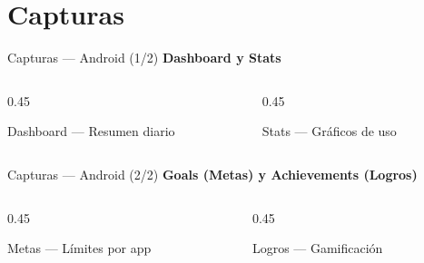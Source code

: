 \documentclass[aspectratio=169]{beamer}
\begin{document}
\section{Capturas}
\begin{frame}{Capturas --- Android (1/2)}
  \centering
  \textbf{Dashboard y Stats}
  \vspace{0.3cm}

  \begin{columns}[T]
    \begin{column}{0.45\textwidth}
      \centering
      \par
      \tiny{Dashboard --- Resumen diario}
    \end{column}
    \begin{column}{0.45\textwidth}
      \centering
      \par
      \tiny{Stats --- Gr\'aficos de uso}
    \end{column}
  \end{columns}
\end{frame}

\begin{frame}{Capturas --- Android (2/2)}
  \centering
  \textbf{Goals (Metas) y Achievements (Logros)}
  \vspace{0.3cm}

  \begin{columns}[T]
    \begin{column}{0.45\textwidth}
      \centering
      \par
      \tiny{Metas --- L\'imites por app}
    \end{column}
    \begin{column}{0.45\textwidth}
      \centering
      \par
      \tiny{Logros --- Gamificaci\'on}
    \end{column}
  \end{columns}
\end{frame}
\end{document}
